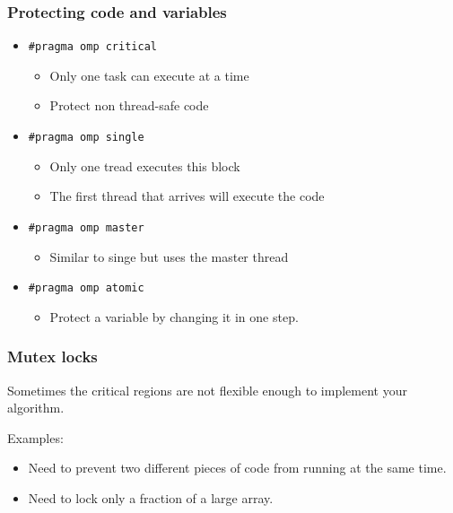 \subsubsection{Protecting code and
variables}\label{protecting-code-and-variables}

\begin{itemize}
\itemsep1pt\parskip0pt
\item
  \texttt{\#pragma omp critical}

  \begin{itemize}
  \itemsep1pt\parskip0pt
  \item
    Only one task can execute at a time
  \item
    Protect non thread-safe code
  \end{itemize}
\item
  \texttt{\#pragma omp single}

  \begin{itemize}
  \itemsep1pt\parskip0pt
  \item
    Only one tread executes this block
  \item
    The first thread that arrives will execute the code
  \end{itemize}
\item
  \texttt{\#pragma omp master}

  \begin{itemize}
  \itemsep1pt\parskip0pt
  \item
    Similar to singe but uses the master thread
  \end{itemize}
\item
  \texttt{\#pragma omp atomic}

  \begin{itemize}
  \itemsep1pt\parskip0pt
  \item
    Protect a variable by changing it in one step.
  \end{itemize}
\end{itemize}

\subsubsection{Mutex locks}\label{mutex-locks}

Sometimes the critical regions are not flexible enough to implement your
algorithm.

Examples:

\begin{itemize}
\itemsep1pt\parskip0pt
\item
  Need to prevent two different pieces of code from running at the same
  time.
\item
  Need to lock only a fraction of a large array.
\end{itemize}

